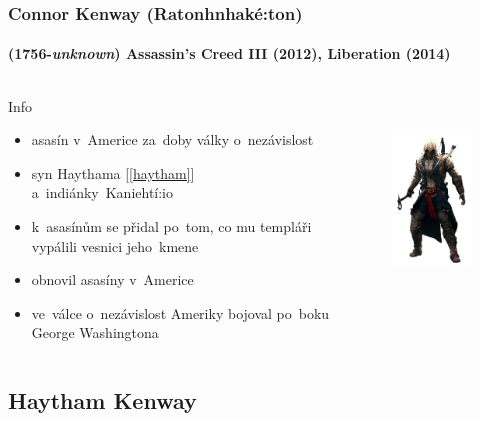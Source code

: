 \documentclass[hyperref={colorlinks, linkcolor=white, urlcolor=green!50!black}]{beamer}
\begin{document}
\begin{frame}\label{connor}
\frametitle{Connor Kenway (Ratonhnhaké:ton)}
\framesubtitle{(1756-\textit{unknown}) \hfill Assassin's Creed III (2012), Liberation (2014)}
\begin{columns}[c]
	
	\begin{block}{Info}
	\begin{itemize}
		\item asasín v~Americe za~doby války o~nezávislost
		\item syn Haythama [\ref{haytham}] a~indiánky~Kaniehtí:io
		\item k~asasínům se přidal po~tom, co mu templáři vypálili vesnici jeho~kmene
		\item obnovil asasíny v~Americe
		\item ve~válce o~nezávislost Ameriky bojoval po~boku {\color{darkred} George Washingtona}
	\end{itemize}
	\end{block}
	
	\begin{figure}[h]
		\centering
		\includegraphics[height=200px]{char_connor}
	\end{figure}
	
\end{columns}
\end{frame}

\subsection[Haytham]{Haytham Kenway}
\end{document}
